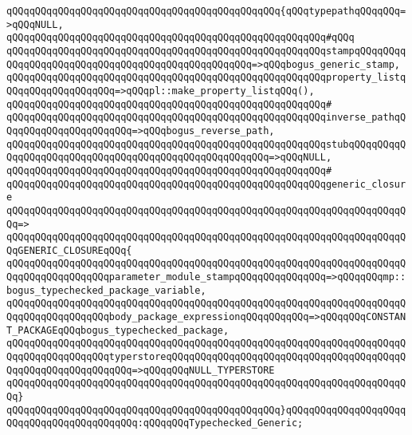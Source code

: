 \verb|qQQqqQQqqQQqqQQqqQQqqQQqqQQqqQQqqQQqqQQqqQQqqQQq{qQQqtypepathqQQqqQQq=>qQQqNULL,|\newline
\verb|qQQqqQQqqQQqqQQqqQQqqQQqqQQqqQQqqQQqqQQqqQQqqQQqqQQqqQQq#qQQq|\newline
\verb|qQQqqQQqqQQqqQQqqQQqqQQqqQQqqQQqqQQqqQQqqQQqqQQqqQQqqQQqstampqQQqqQQqqQQqqQQqqQQqqQQqqQQqqQQqqQQqqQQqqQQqqQQqqQQq=>qQQqbogus_generic_stamp,|\newline
\verb|qQQqqQQqqQQqqQQqqQQqqQQqqQQqqQQqqQQqqQQqqQQqqQQqqQQqqQQqproperty_listqQQqqQQqqQQqqQQqqQQq=>qQQqpl::make_property_listqQQq(),|\newline
\verb|qQQqqQQqqQQqqQQqqQQqqQQqqQQqqQQqqQQqqQQqqQQqqQQqqQQqqQQq#|\newline
\verb|qQQqqQQqqQQqqQQqqQQqqQQqqQQqqQQqqQQqqQQqqQQqqQQqqQQqqQQqinverse_pathqQQqqQQqqQQqqQQqqQQqqQQq=>qQQqbogus_reverse_path,|\newline
\verb|qQQqqQQqqQQqqQQqqQQqqQQqqQQqqQQqqQQqqQQqqQQqqQQqqQQqqQQqstubqQQqqQQqqQQqqQQqqQQqqQQqqQQqqQQqqQQqqQQqqQQqqQQqqQQqqQQq=>qQQqNULL,|\newline
\verb|qQQqqQQqqQQqqQQqqQQqqQQqqQQqqQQqqQQqqQQqqQQqqQQqqQQqqQQq#|\newline
\verb|qQQqqQQqqQQqqQQqqQQqqQQqqQQqqQQqqQQqqQQqqQQqqQQqqQQqqQQqgeneric_closure|\newline
\verb|qQQqqQQqqQQqqQQqqQQqqQQqqQQqqQQqqQQqqQQqqQQqqQQqqQQqqQQqqQQqqQQqqQQqqQQq=>|\newline
\verb|qQQqqQQqqQQqqQQqqQQqqQQqqQQqqQQqqQQqqQQqqQQqqQQqqQQqqQQqqQQqqQQqqQQqqQQqGENERIC_CLOSUREqQQq{|\newline
\verb|qQQqqQQqqQQqqQQqqQQqqQQqqQQqqQQqqQQqqQQqqQQqqQQqqQQqqQQqqQQqqQQqqQQqqQQqqQQqqQQqqQQqqQQqparameter_module_stampqQQqqQQqqQQqqQQq=>qQQqqQQqmp::bogus_typechecked_package_variable,|\newline
\verb|qQQqqQQqqQQqqQQqqQQqqQQqqQQqqQQqqQQqqQQqqQQqqQQqqQQqqQQqqQQqqQQqqQQqqQQqqQQqqQQqqQQqqQQqbody_package_expressionqQQqqQQqqQQq=>qQQqqQQqCONSTANT_PACKAGEqQQqbogus_typechecked_package,|\newline
\verb|qQQqqQQqqQQqqQQqqQQqqQQqqQQqqQQqqQQqqQQqqQQqqQQqqQQqqQQqqQQqqQQqqQQqqQQqqQQqqQQqqQQqqQQqtyperstoreqQQqqQQqqQQqqQQqqQQqqQQqqQQqqQQqqQQqqQQqqQQqqQQqqQQqqQQqqQQqqQQq=>qQQqqQQqNULL_TYPERSTORE|\newline
\verb|qQQqqQQqqQQqqQQqqQQqqQQqqQQqqQQqqQQqqQQqqQQqqQQqqQQqqQQqqQQqqQQqqQQqqQQq}|\newline
\verb|qQQqqQQqqQQqqQQqqQQqqQQqqQQqqQQqqQQqqQQqqQQqqQQq}qQQqqQQqqQQqqQQqqQQqqQQqqQQqqQQqqQQqqQQqqQQq:qQQqqQQqTypechecked_Generic;|\newline
